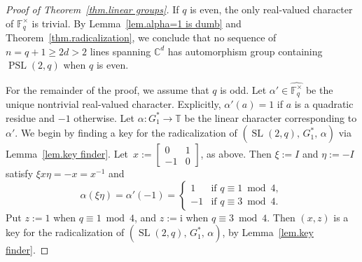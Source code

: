 \documentclass[11pt]{article}
\theoremstyle{definition}
\numberwithin{equation}{section}
\begin{document}
\begin{proof}[Proof of Theorem~\ref{thm.linear groups}]
If $q$ is even, the only real-valued character of $\mathbb{F}_q^\times$ is trivial.
By Lemma~\ref{lem.alpha=1 is dumb} and Theorem~\ref{thm.radicalization}, we conclude that no sequence of $n = q+1 \geq 2d > 2$ lines spanning $\mathbb{C}^d$ has automorphism group containing $\operatorname{PSL}(2,q)$ when $q$ is even.

For the remainder of the proof, we assume that $q$ is odd.
Let $\alpha' \in \widehat{ \mathbb{F}_q^\times }$ be the unique nontrivial real-valued character.
Explicitly, $\alpha'(a) = 1$ if $a$ is a quadratic residue and $-1$ otherwise.
Let $\alpha \colon G_1^* \to \mathbb{T}$ be the linear character corresponding to $\alpha'$.
We begin by finding a key for the radicalization of $( \operatorname{SL}(2,q),\, G_1^*,\, \alpha)$ via Lemma~\ref{lem.key finder}.
Let~$x := \begin{bmatrix} 0 & 1 \\ -1 & 0 \end{bmatrix}$, as above.
Then $\xi := I$ and $\eta := -I$ satisfy $\xi x \eta = -x = x^{-1}$ and
\[ \alpha(\xi \eta) = \alpha'(-1)=
\begin{cases}
1 & \text{if } q \equiv 1 \bmod 4, \\
-1 & \text{if } q \equiv 3 \bmod 4.
\end{cases}
\]
Put $z :=1$ when $q \equiv 1 \bmod 4$, and $z:=\mathrm{i}$ when $q \equiv 3 \bmod 4$.
Then $(x,z)$ is a key for the radicalization of $( \operatorname{SL}(2,q),\, G_1^*,\, \alpha)$, by Lemma~\ref{lem.key finder}.



\end{proof}
\end{document}
